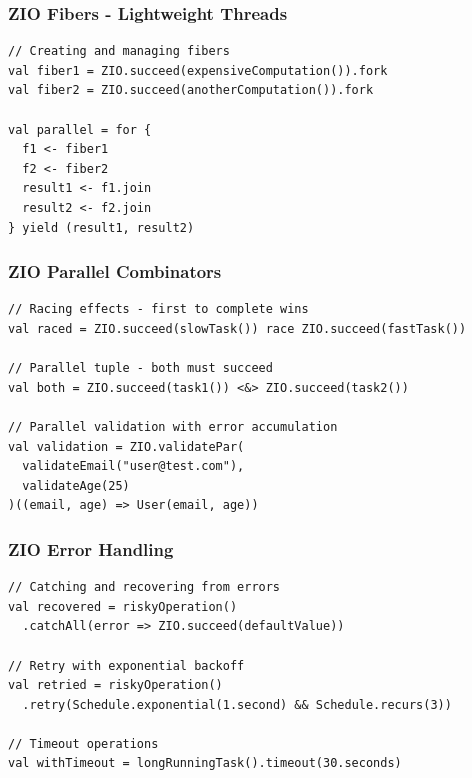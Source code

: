 \documentclass{beamer}
\begin{document}
\begin{frame}[fragile]
\frametitle{ZIO Fibers - Lightweight Threads}

\begin{lstlisting}[style=scalaStyle]
// Creating and managing fibers
val fiber1 = ZIO.succeed(expensiveComputation()).fork
val fiber2 = ZIO.succeed(anotherComputation()).fork

val parallel = for {
  f1 <- fiber1
  f2 <- fiber2
  result1 <- f1.join
  result2 <- f2.join
} yield (result1, result2)
\end{lstlisting}

\end{frame}

\begin{frame}[fragile]
\frametitle{ZIO Parallel Combinators}

\begin{lstlisting}[style=scalaStyle]
// Racing effects - first to complete wins
val raced = ZIO.succeed(slowTask()) race ZIO.succeed(fastTask())

// Parallel tuple - both must succeed
val both = ZIO.succeed(task1()) <&> ZIO.succeed(task2())

// Parallel validation with error accumulation
val validation = ZIO.validatePar(
  validateEmail("user@test.com"),
  validateAge(25)
)((email, age) => User(email, age))
\end{lstlisting}

\end{frame}

\begin{frame}[fragile]
\frametitle{ZIO Error Handling}

\begin{lstlisting}[style=scalaStyle]
// Catching and recovering from errors
val recovered = riskyOperation()
  .catchAll(error => ZIO.succeed(defaultValue))

// Retry with exponential backoff
val retried = riskyOperation()
  .retry(Schedule.exponential(1.second) && Schedule.recurs(3))

// Timeout operations
val withTimeout = longRunningTask().timeout(30.seconds)
\end{lstlisting}

\end{frame}
\end{document}
